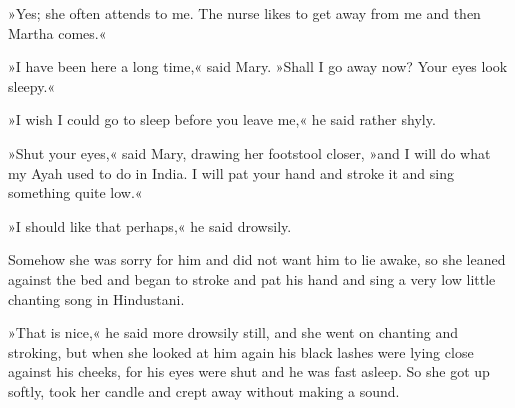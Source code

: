 »Yes; she often attends to me. The nurse likes to get away from me and then Martha comes.«

»I have been here a long time,« said Mary. »Shall I go away now? Your eyes look sleepy.«

»I wish I could go to sleep before you leave me,« he said rather shyly.

»Shut your eyes,« said Mary, drawing her footstool closer, »and I will do what my Ayah used to do in India. I will pat your hand and stroke it and sing something quite low.«

»I should like that perhaps,« he said drowsily.

Somehow she was sorry for him and did not want him to lie awake, so she leaned against the bed and began to stroke and pat his hand and sing a very low little chanting song in Hindustani.

»That is nice,« he said more drowsily still, and she went on chanting and stroking, but when she looked at him again his black lashes were lying close against his cheeks, for his eyes were shut and he was fast asleep. So she got up softly, took her candle and crept away without making a sound.